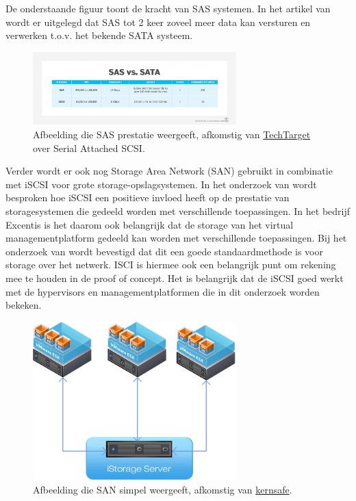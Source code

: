 \FloatBarrier
De onderstaande figuur toont de kracht van SAS systemen. In het artikel van \textcite{loshin2022sas} wordt er uitgelegd dat SAS tot 2 keer zoveel meer data kan versturen en verwerken t.o.v. het bekende SATA systeem.

\begin{figure}[h!]
    \centering
    \includegraphics[width=0.7\textwidth]{../onderzoek/sas_vs_sata-f.png} 
    \caption{Afbeelding die SAS prestatie weergeeft, afkomstig van \href{https://www.techtarget.com/searchstorage/definition/serial-attached-SCSI}{TechTarget} over Serial Attached SCSI.}
    \label{fig:saspres}
\end{figure}


\FloatBarrier
Verder wordt er ook nog Storage Area Network (SAN) gebruikt in combinatie met iSCSI voor grote storage-opslagsystemen. In het onderzoek van \textcite{park2024performance} wordt besproken hoe iSCSI een positieve invloed heeft op de prestatie van storagesystemen die gedeeld worden met verschillende toepassingen.
In het bedrijf Excentis is het daarom ook belangrijk dat de storage van het virtual managementplatform gedeeld kan worden met verschillende toepassingen. Bij het onderzoek van \textcite{park2024performance} wordt bevestigd dat dit een goede standaardmethode is voor storage over het netwerk.
ISCI is hiermee ook een belangrijk punt om rekening mee te houden in de proof of concept. Het is belangrijk dat de iSCSI goed werkt met de hypervisors en managementplatformen die in dit onderzoek worden bekeken.

\begin{figure}[h!]
  \centering
  \includegraphics[width=0.7\textwidth]{../onderzoek/nas-isci.png} 
  \caption{Afbeelding die SAN simpel weergeeft, afkomstig van \href{https://www.kernsafe.com/images/VMware-iSCSI-iStorage-Server.png}{kernsafe}.}
  \label{fig:san}
\end{figure}


